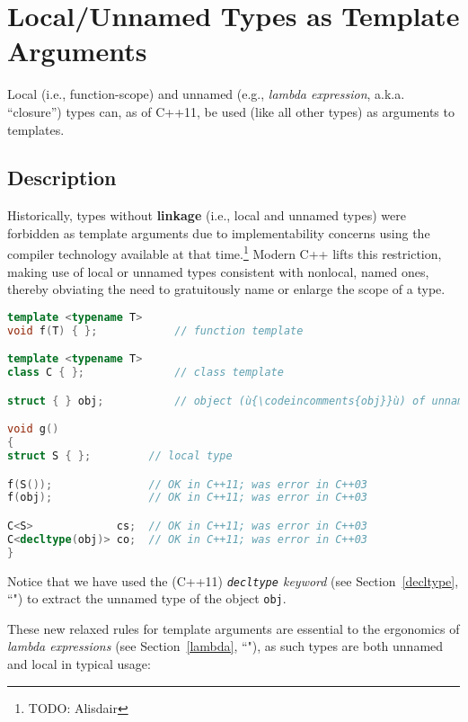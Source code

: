 \newpage
\section[Local Types '11]{Local/Unnamed Types as Template Arguments}\label{local-types-as-template-arguments}

Local (i.e., function-scope) and unnamed (e.g., \textit{lambda
expression}, a.k.a. ``closure'') types can, as of C++11, be used (like all other
types) as arguments to templates.

\subsection[Description]{Description}\label{description}

Historically, types without \textbf{linkage} (i.e., local and unnamed
types) were forbidden as template arguments due to implementability
concerns using the compiler technology available at that
time.{\cprotect\footnote{TODO: Alisdair}} Modern C++ lifts this
restriction, making use of local or unnamed types consistent with
nonlocal, named ones, thereby obviating the need to gratuitously name
or enlarge the scope of a type.

\begin{lstlisting}[language=C++]
template <typename T>
void f(T) { };            // function template

template <typename T>
class C { };              // class template

struct { } obj;           // object (ù{\codeincomments{obj}}ù) of unnamed C++ type

void g()
{
struct S { };         // local type

f(S());               // OK in C++11; was error in C++03
f(obj);               // OK in C++11; was error in C++03

C<S>             cs;  // OK in C++11; was error in C++03
C<decltype(obj)> co;  // OK in C++11; was error in C++03
}
\end{lstlisting}

\noindent Notice that we have used the (C++11) {\it \texttt{decltype}
keyword} (see Section~\ref{decltype}, ``") to extract the unnamed type of the object \texttt{obj}.

These new relaxed rules for template arguments are essential to the
ergonomics of {\it lambda expressions} (see Section~\ref{lambda}, ``"), as such types are both
unnamed and local in typical usage:

